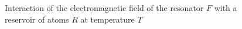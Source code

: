 \begin{figure}
\centering



\caption{Interaction of the electromagnetic field of the resonator $F$ with
  a reservoir of atoms $R$ at temperature $T$}
\label{figPart1Ch2_7}
\end{figure}